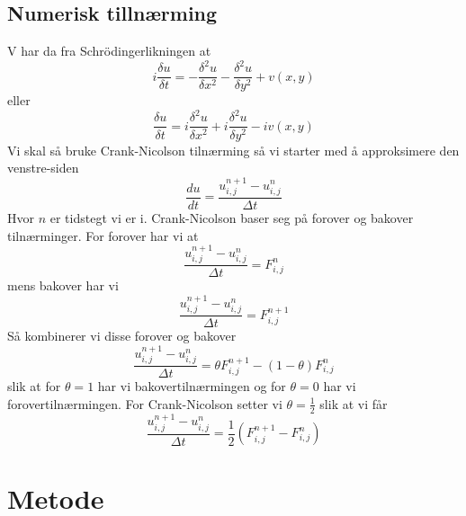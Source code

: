 \documentclass[reprint,english,notitlepage]{revtex4-2}  %
\begin{document}
\subsection{Numerisk tillnærming} 
V har da fra Schrödingerlikningen at
$$
i\frac{\delta u}{\delta t}=-\frac{\delta^2 u}{\delta x^2}-\frac{\delta^2 u}{\delta y^2}+v(x,y)
$$
eller 
$$
\frac{\delta u}{\delta t}=i\frac{\delta^2 u}{\delta x^2}+i\frac{\delta^2 u}{\delta y^2}-iv(x,y)
$$
Vi skal så bruke Crank-Nicolson tilnærming så vi starter med å approksimere den venstre-siden
$$
\frac{d u}{dt}=\frac{u^{n+1}_{i,j}-u^{n}_{i,j}}{\Delta t}
$$
Hvor $n$ er tidstegt vi er i.
Crank-Nicolson baser seg på forover og bakover tilnærminger. For forover har vi at
$$
\frac{u^{n+1}_{i,j}-u^{n}_{i,j}}{\Delta t}=F^{n}_{i,j}
$$ 
mens bakover har vi
$$
\frac{u^{n+1}_{i,j}-u^{n}_{i,j}}{\Delta t}=F^{n+1}_{i,j}
$$
Så kombinerer vi disse forover og bakover
$$
\frac{u^{n+1}_{i,j}-u^n_{i,j}}{\Delta t}=\theta F^{n+1}_{i,j}-(1-\theta)F^{n}_{i,j}
$$
slik at for $\theta=1$ har vi bakovertilnærmingen og for $\theta=0$ har vi forovertilnærmingen.
For Crank-Nicolson setter vi $\theta =\frac{1}{2}$ slik at vi får
$$
\frac{u^{n+1}_{i,j}-u^n_{i,j}}{\Delta t}=\frac{1}{2}(F^{n+1}_{i,j}-F^{n}_{i,j})
$$
\section{Metode}
\end{document}
